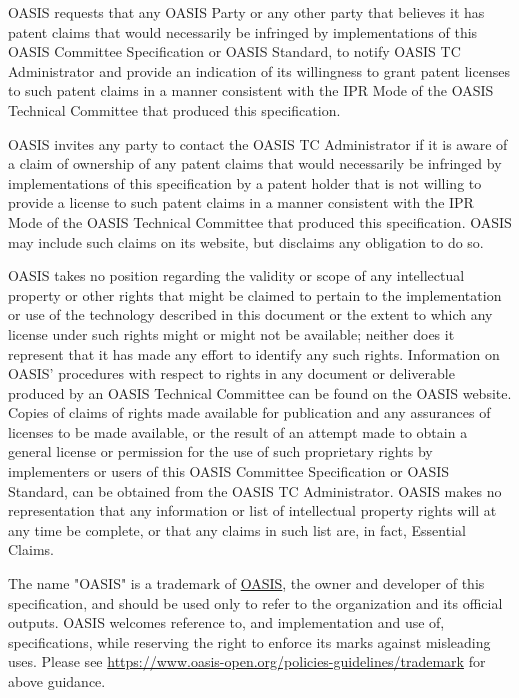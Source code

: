 \begin{titlepage}
OASIS requests that any OASIS Party or any other party that believes
it has patent claims that would necessarily be infringed by
implementations of this OASIS Committee Specification or OASIS
Standard, to notify OASIS TC Administrator and provide an indication
of its willingness to grant patent licenses to such patent claims in a
manner consistent with the IPR Mode of the OASIS Technical Committee
that produced this specification.

OASIS invites any party to contact the OASIS TC Administrator if it is
aware of a claim of ownership of any patent claims that would
necessarily be infringed by implementations of this specification by a
patent holder that is not willing to provide a license to such patent
claims in a manner consistent with the IPR Mode of the OASIS Technical
Committee that produced this specification. OASIS may include such
claims on its website, but disclaims any obligation to do so.

OASIS takes no position regarding the validity or scope of any
intellectual property or other rights that might be claimed to pertain
to the implementation or use of the technology described in this
document or the extent to which any license under such rights might or
might not be available; neither does it represent that it has made any
effort to identify any such rights. Information on OASIS' procedures
with respect to rights in any document or deliverable produced by an
OASIS Technical Committee can be found on the OASIS website. Copies of
claims of rights made available for publication and any assurances of
licenses to be made available, or the result of an attempt made to
obtain a general license or permission for the use of such proprietary
rights by implementers or users of this OASIS Committee Specification
or OASIS Standard, can be obtained from the OASIS TC Administrator.
OASIS makes no representation that any information or list of
intellectual property rights will at any time be complete, or that any
claims in such list are, in fact, Essential Claims.

The name "OASIS" is a trademark of \href{https://www.oasis-open.org/}{OASIS}, the owner and developer of
this specification, and should be used only to refer to the
organization and its official outputs. OASIS welcomes reference to,
and implementation and use of, specifications, while reserving the
right to enforce its marks against misleading uses. Please see
\url{https://www.oasis-open.org/policies-guidelines/trademark} for above guidance.
\\\\

\end{titlepage}
